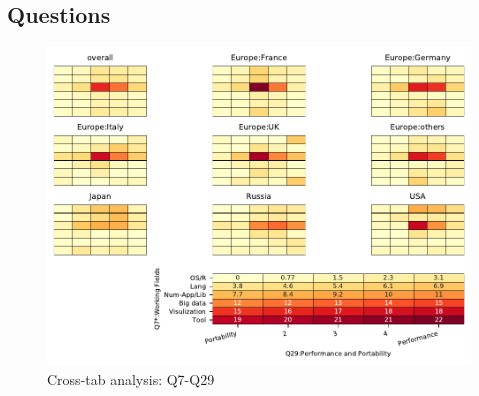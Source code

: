 
\subsection{Questions}


\begin{figure}
\begin{center}
\includegraphics[width=12cm]{../pdfs/Q7-Q29.pdf}
\caption{Cross-tab analysis: Q7-Q29}
\label{fig:Q7-Q29}
\end{center}
\end{figure}
